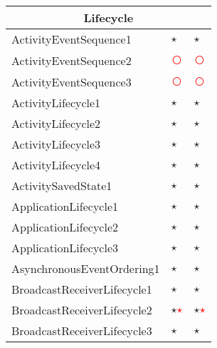 \documentclass[../draft.tex]{subfiles}
\newcommand{\fp}{\textcolor{white}{\textcircled{\textcolor{red}{$\star$}}}}
\newcommand{\fn}{\textcolor{red}{\textcircled{ }}}
\newcommand{\tp}[0]{\textcircled{$\star$}}
\newcommand{\tsub}[1]{\multicolumn{3}{c}{#1}\\\hline}
\begin{document}
\begin{longtable}{l | l | l}
        \tsub{Lifecycle}
        ActivityEventSequence1 & \tp & \tp\\
        ActivityEventSequence2 & \fn & \fn\\
        ActivityEventSequence3 & \fn & \fn\\
        ActivityLifecycle1 & \tp & \tp\\
        ActivityLifecycle2 & \tp & \tp\\
        ActivityLifecycle3 & \tp & \tp\\
        ActivityLifecycle4 & \tp & \tp\\
        ActivitySavedState1 & \tp & \tp\\
        ApplicationLifecycle1 & \tp & \tp\\
        ApplicationLifecycle2 & \tp & \tp\\
        ApplicationLifecycle3 & \tp & \tp\\
        AsynchronousEventOrdering1 & \tp & \tp\\
        BroadcastReceiverLifecycle1 & \tp & \tp\\
        BroadcastReceiverLifecycle2 & \tp \fp & \tp \fp\\
        BroadcastReceiverLifecycle3 & \tp & \tp\\

\end{longtable}
\end{document}
